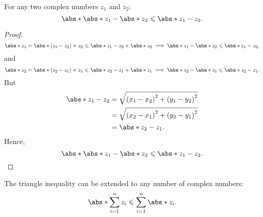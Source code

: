 \documentclass{article}
\begin{document}
\begin{theorem}
    For any two complex numbers \(z_1\) and \(z_2\):
    \begin{equation*}
        \abs*{\abs*{z_1} - \abs*{z_2}} \leqslant \abs*{z_1 - z_2}.
    \end{equation*}
\end{theorem}
\begin{proof}
    \begin{equation*}
        \abs*{z_1} = \abs*{\left( z_1 - z_2 \right) + z_2} \leqslant \abs*{z_1 - z_2} + \abs*{z_2} \implies \abs*{z_1} - \abs*{z_2} \leqslant \abs*{z_1 - z_2},
    \end{equation*}
    and
    \begin{equation*}
        \abs*{z_2} = \abs*{\left( z_2 - z_1 \right) + z_1} \leqslant \abs*{z_2 - z_1} + \abs*{z_1} \implies \abs*{z_2} - \abs*{z_1} \leqslant \abs*{z_2 - z_1}.
    \end{equation*}
    But
    \begin{align*}
        \abs*{z_1 - z_2} & = \sqrt{\left( x_1 - x_2 \right)^2 + \left( y_1 - y_2 \right)^2} \\
                         & = \sqrt{\left( x_2 - x_1 \right)^2 + \left( y_2 - y_1 \right)^2} \\
                         & = \abs*{z_2 - z_1}.
    \end{align*}
    Hence,
    \begin{equation*}
        \abs*{\abs*{z_1} - \abs*{z_2}} \leqslant \abs*{z_1 - z_2}.
    \end{equation*}
\end{proof}
\begin{corollary}
    The triangle inequality can be extended to any number of complex
    numbers:
    \begin{equation*}
        \abs*{\sum_{i = 1}^n z_i} \leqslant \sum_{i = 1}^n \abs*{z_i}.
    \end{equation*}
\end{corollary}
\end{document}
